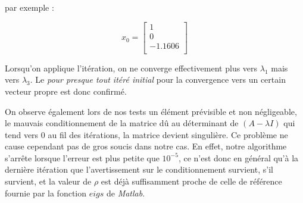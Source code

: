 par exemple  :

$$ x_0 = \left[
\begin{array}{c}
  1  \\
  0 \\
  -1.1606\\
\end{array}
\right]$$

Lorsqu'on applique l'itération, on ne converge effectivement plus vers $\lambda_1$ mais vers $\lambda_3$. Le \textit{pour presque tout itéré initial} pour la convergence vers un certain vecteur propre est donc confirmé.

On observe également lors de nos tests un élément prévisible et non négligeable, le mauvais conditionnement de la matrice dû au déterminant de $(A-\lambda I)$ qui tend vers $0$ au fil des itérations, la matrice devient singulière. Ce problème ne cause cependant pas de gros soucis dans notre cas. En effet, notre algorithme s'arrête lorsque l'erreur est plus petite que $10^{-5}$, ce n'est donc en général qu'à la dernière itération que l'avertissement sur le conditionnement survient, s'il survient, et la valeur de $\rho$ est déjà suffisamment proche de celle de référence fournie par la fonction $eigs$ de \textit{Matlab}.




